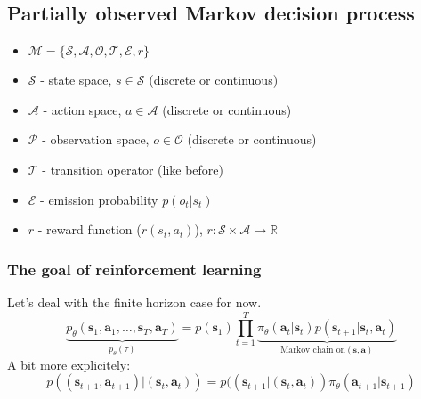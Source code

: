 \documentclass{report}
\begin{document}
\subsection{Partially observed Markov decision process}
\begin{figure}[htpb]
\begin{center}
\end{center}
\end{figure}
\begin{itemize}
		\item $\mathcal{M} = \{\mathcal{S}, \mathcal{A}, \mathcal{O}, \mathcal{T}, \mathcal{E}, r\}$
\item $\mathcal{S}$ - state space, $s \in \mathcal{S}$ (discrete or continuous)
\item $\mathcal{A}$ - action space, $a \in \mathcal{A}$ (discrete or continuous)
\item $\mathcal{P}$ - observation space, $o \in \mathcal{O}$ (discrete or continuous)
\item $\mathcal{T}$ - transition operator (like before)
\item $\mathcal{E}$ - emission probability $p(o_t|s_t)$
\item $r$ - reward function ($r(s_t, a_t)$), $r : \mathcal{S} \times \mathcal{A} \to \mathbb{R}$
\end{itemize}

\subsubsection{The goal of reinforcement learning}
Let's deal with the finite horizon case for now.
\begin{equation}
\underbrace{p_\theta(\bm{s}_1, \bm{a}_1, \dots, \bm{s}_T, \bm{a}_T)}_{p_\theta(\tau)} = p(\bm{s}_1) \prod^{T}_{t=1} 
\underbrace{\pi_{\theta} (\bm{a}_t | \bm{s}_t) p (\bm{s}_{t+1} | \bm{s}_t, \bm{a}_t)}_{\text{Markov chain on} (\bm{s}, \bm{a})}
\end{equation}
A bit more explicitely:
\begin{equation}
p((\bm{s}_{t+1}, \bm{a}_{t+1}) | (\bm{s}_t, \bm{a}_t)) = 
p((\bm{s}_{t+1}| (\bm{s}_t, \bm{a}_t)) \pi_\theta (\bm{a}_{t+1} | \bm{s}_{t+1})
\end{equation}
\end{document}
